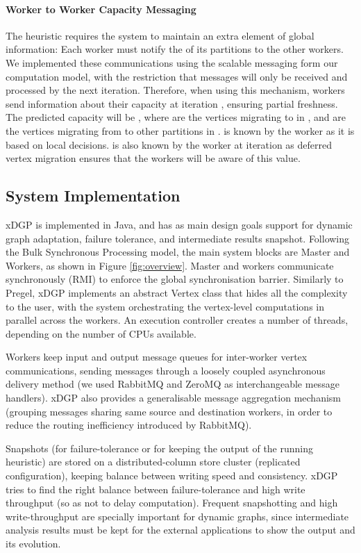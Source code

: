\documentclass{sig-alternate-10pt}
\begin{document}
\paragraph{\textbf{Worker to Worker Capacity Messaging}} The heuristic requires the system to maintain an extra element of global information: Each worker must notify the  of its partitions to the other workers. We implemented these communications using the scalable messaging form our computation model, with the restriction that messages will only be received and processed by the next iteration.  Therefore, when using this mechanism, workers  send information about their capacity at iteration , ensuring partial freshness. The predicted capacity will be , where  are the vertices migrating to  in , and  are the vertices migrating from  to other partitions in .  is known by the worker as it is based on local decisions.   is also known by the worker at iteration  as deferred vertex migration ensures that the workers will be aware of this value. 

\subsection{System Implementation}

xDGP  is implemented in Java, and has as main design goals support for dynamic graph adaptation, failure tolerance, and intermediate results snapshot. Following the Bulk Synchronous Processing \cite{Valiant1990} model, the main system blocks are Master and Workers, as shown in Figure \ref{fig:overview}. Master and workers communicate synchronously (RMI) to enforce the global synchronisation barrier. Similarly to Pregel, xDGP implements an abstract Vertex class that hides all the complexity to the user, with the system orchestrating the vertex-level computations in parallel across the workers. An execution controller creates a number of threads, depending on the number of CPUs available. 

Workers keep input and output message queues for inter-worker vertex communications, sending messages through a loosely coupled asynchronous delivery method (we used RabbitMQ and ZeroMQ as interchangeable message handlers). xDGP also provides a generalisable message aggregation mechanism (grouping messages sharing same source and destination workers, in order to reduce the routing inefficiency introduced by RabbitMQ).

Snapshots (for failure-tolerance or for keeping the output of the running heuristic) are stored on a distributed-column store cluster (replicated configuration), keeping balance between writing speed and consistency. xDGP tries to find the right balance between failure-tolerance and high write throughput (so as not to delay computation). Frequent snapshotting and high write-throughput are specially important for dynamic graphs, since intermediate analysis results must be kept for the external applications to show the output and its evolution.
\end{document}
